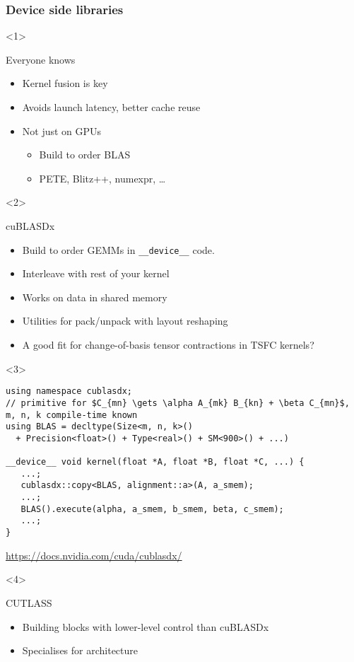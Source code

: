 \documentclass[aspectratio=169]{beamer}
\begin{document}
\begin{frame}[fragile]
  \frametitle{Device side libraries}
  \begin{onlyenv}<1>
    \begin{block}{Everyone knows}
      \begin{itemize}
      \item Kernel fusion is key
      \item Avoids launch latency, better cache reuse
      \item Not just on GPUs
        \begin{itemize}
        \item Build to order BLAS
        \item PETE, Blitz++, numexpr, \dots
        \end{itemize}
      \end{itemize}
    \end{block}
  \end{onlyenv}
  \begin{onlyenv}<2>
    \begin{block}{cuBLASDx}
      \begin{itemize}
      \item Build to order GEMMs in \verb~__device__~ code.
      \item Interleave with rest of your kernel
      \item Works on data in shared memory
      \item Utilities for pack/unpack with layout reshaping
      \item A good fit for change-of-basis tensor contractions in TSFC
        kernels?
      \end{itemize}
    \end{block}
  \end{onlyenv}
  \begin{onlyenv}<3>
\begin{verbatim}
using namespace cublasdx;
// primitive for $C_{mn} \gets \alpha A_{mk} B_{kn} + \beta C_{mn}$, m, n, k compile-time known
using BLAS = decltype(Size<m, n, k>()
  + Precision<float>() + Type<real>() + SM<900>() + ...)

__device__ void kernel(float *A, float *B, float *C, ...) {
   ...; 
   cublasdx::copy<BLAS, alignment::a>(A, a_smem);
   ...;
   BLAS().execute(alpha, a_smem, b_smem, beta, c_smem);
   ...;
}
\end{verbatim}
    {
      \scriptsize
      \raggedleft
      \url{https://docs.nvidia.com/cuda/cublasdx/}
      \par
    }
  \end{onlyenv}
  \begin{onlyenv}<4>
    \begin{block}{CUTLASS}
      \begin{itemize}
      \item Building blocks with lower-level control than cuBLASDx
      \item Specialises for architecture
      

\end{itemize}
\end{block}
\end{onlyenv}
\end{frame}
\end{document}
